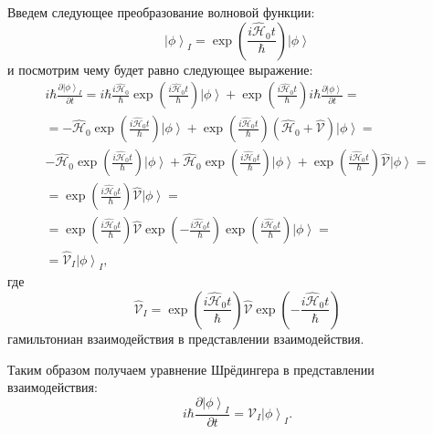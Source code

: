 Введем следующее преобразование волновой функции:
\[
\left| \phi \right>_I = 
\exp{\left(\frac{i \hat{\mathcal{H}}_0 t}{\hbar}\right)}
\left| \phi \right>
\]
и посмотрим чему будет равно следующее выражение:
\begin{eqnarray}
i \hbar \frac{\partial \left| \phi \right>_I}{\partial t} = 
i \hbar \frac{i \hat{\mathcal{H}}_0}{\hbar} 
\exp{\left(\frac{i \hat{\mathcal{H}}_0 t}{\hbar}\right)}
\left| \phi \right> +
\exp{\left(\frac{i \hat{\mathcal{H}}_0 t}{\hbar}\right)}
i \hbar \frac{\partial \left| \phi \right>}{\partial t} = 
\nonumber \\
= - \hat{\mathcal{H}}_0 
\exp{\left(\frac{i \hat{\mathcal{H}}_0 t}{\hbar}\right)}
\left| \phi \right> +
\exp{\left(\frac{i \hat{\mathcal{H}}_0 t}{\hbar}\right)}
\left(
\hat{\mathcal{H}}_0 + \hat{\mathcal{V}}
\right)
\left| \phi \right> =
\nonumber \\ 
- \hat{\mathcal{H}}_0 
\exp{\left(\frac{i \hat{\mathcal{H}}_0 t}{\hbar}\right)}
\left| \phi \right> +
\hat{\mathcal{H}}_0 
\exp{\left(\frac{i \hat{\mathcal{H}}_0 t}{\hbar}\right)}
\left| \phi \right>
+
\exp{\left(\frac{i \hat{\mathcal{H}}_0 t}{\hbar}\right)}
 \hat{\mathcal{V}}
\left| \phi \right> =
\nonumber \\
= 
\exp{\left(\frac{i \hat{\mathcal{H}}_0 t}{\hbar}\right)}
 \hat{\mathcal{V}}
\left| \phi \right> = 
\nonumber \\
= 
\exp{\left(\frac{i \hat{\mathcal{H}}_0 t}{\hbar}\right)}
 \hat{\mathcal{V}}
\exp{\left( - \frac{i \hat{\mathcal{H}}_0 t}{\hbar}\right)}
\exp{\left(\frac{i \hat{\mathcal{H}}_0 t}{\hbar}\right)}
\left| \phi \right> = 
\nonumber \\
= 
 \hat{\mathcal{V}}_I \left| \phi \right>_I,
\nonumber
\end{eqnarray}
где 
\begin{equation}
\hat{\mathcal{V}}_I = 
\exp{\left(\frac{i \hat{\mathcal{H}}_0 t}{\hbar}\right)}
 \hat{\mathcal{V}}
\exp{\left( - \frac{i \hat{\mathcal{H}}_0 t}{\hbar}\right)}
\label{eqAddWaveFunc_VInter}
\end{equation} 
гамильтониан взаимодействия в представлении взаимодействия.

Таким образом получаем уравнение Шрёдингера в представлении
взаимодействия:
\begin{equation}
i \hbar \frac{\partial \left| \phi \right>_I}{\partial t} = \hat{\mathcal{V}}_I
\left| \phi \right>_I.
\label{eqAddWaveFunc_ShredingerInter}
\end{equation}


